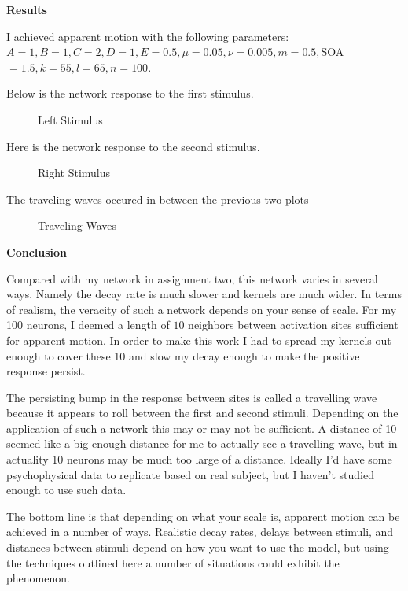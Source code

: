 \documentclass[a4paper,12pt]{article}
\begin{document}
\vfil\eject

{\bf Results}

I achieved apparent motion with the following parameters: $A=1,B=1,C=2,D=1,E=0.5,\mu=0.05,\nu=0.005,m=0.5,$SOA$=1.5,k=55,l=65,n=100$. 
\smallskip

Below is the network response to the first stimulus.
\begin{center}
  \begin{figure}[h!]
    \caption{\label{pict1}Left Stimulus}
  \end{figure}
\end{center}

\vfil\eject

Here is the network response to the second stimulus. 

\begin{center}
  \begin{figure}[h!]
    \caption{\label{pict1}Right Stimulus}
  \end{figure}
\end{center}

\vfil\eject

The traveling waves occured in between the previous two plots

\begin{center}
  \begin{figure}[h!]
    \caption{\label{pict1}Traveling Waves}
  \end{figure}
\end{center}

{\bf Conclusion}
\smallskip

Compared with my network in assignment two, this network varies in several ways. Namely the decay rate is much slower and kernels are much wider. In terms of realism, the veracity of such a network depends on your sense of scale. For my 100 neurons, I deemed a length of $10$ neighbors between activation sites sufficient for apparent motion. In order to make this work I had to spread my kernels out enough to cover these 10 and slow my decay enough to make the positive response persist.
\smallskip

The persisting bump in the response between sites is called a travelling wave because it appears to roll between the first and second stimuli. Depending on the application of such a network this may or may not be sufficient. A distance of 10 seemed like a big enough distance for me to actually see a travelling wave, but in actuality 10 neurons may be much too large of a distance. Ideally I'd have some psychophysical data to replicate based on real subject, but I haven't studied enough to use such data. 
\smallskip

The bottom line is that depending on what your scale is, apparent motion can be achieved in a number of ways. Realistic decay rates, delays between stimuli, and distances between stimuli depend on how you want to use the model, but using the techniques outlined here a number of situations could exhibit the phenomenon. 
\end{document}
